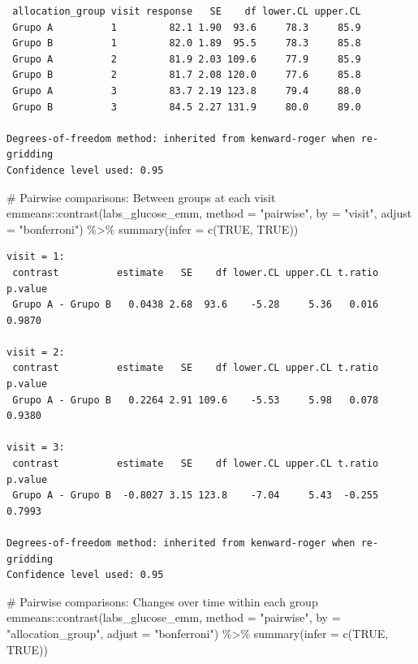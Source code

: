 \documentclass[
  letterpaper,
  DIV=11,
  numbers=noendperiod]{scrartcl}
\newenvironment{Shaded}{\begin{snugshade}}{\end{snugshade}}
\newcommand{\AttributeTok}[1]{\textcolor[rgb]{0.40,0.45,0.13}{#1}}
\newcommand{\CommentTok}[1]{\textcolor[rgb]{0.37,0.37,0.37}{#1}}
\newcommand{\ConstantTok}[1]{\textcolor[rgb]{0.56,0.35,0.01}{#1}}
\newcommand{\FunctionTok}[1]{\textcolor[rgb]{0.28,0.35,0.67}{#1}}
\newcommand{\NormalTok}[1]{\textcolor[rgb]{0.00,0.23,0.31}{#1}}
\newcommand{\SpecialCharTok}[1]{\textcolor[rgb]{0.37,0.37,0.37}{#1}}
\newcommand{\StringTok}[1]{\textcolor[rgb]{0.13,0.47,0.30}{#1}}
\begin{document}
\begin{verbatim}
 allocation_group visit response   SE    df lower.CL upper.CL
 Grupo A          1         82.1 1.90  93.6     78.3     85.9
 Grupo B          1         82.0 1.89  95.5     78.3     85.8
 Grupo A          2         81.9 2.03 109.6     77.9     85.9
 Grupo B          2         81.7 2.08 120.0     77.6     85.8
 Grupo A          3         83.7 2.19 123.8     79.4     88.0
 Grupo B          3         84.5 2.27 131.9     80.0     89.0

Degrees-of-freedom method: inherited from kenward-roger when re-gridding 
Confidence level used: 0.95 
\end{verbatim}

\begin{Shaded}
\begin{Highlighting}[]
\CommentTok{\# Pairwise comparisons: Between groups at each visit}
\NormalTok{emmeans}\SpecialCharTok{::}\FunctionTok{contrast}\NormalTok{(labs\_glucose\_emm, }\AttributeTok{method =} \StringTok{"pairwise"}\NormalTok{, }\AttributeTok{by =} \StringTok{"visit"}\NormalTok{, }\AttributeTok{adjust =} \StringTok{"bonferroni"}\NormalTok{) }\SpecialCharTok{\%\textgreater{}\%} \FunctionTok{summary}\NormalTok{(}\AttributeTok{infer =} \FunctionTok{c}\NormalTok{(}\ConstantTok{TRUE}\NormalTok{, }\ConstantTok{TRUE}\NormalTok{))}
\end{Highlighting}
\end{Shaded}

\begin{verbatim}
visit = 1:
 contrast          estimate   SE    df lower.CL upper.CL t.ratio p.value
 Grupo A - Grupo B   0.0438 2.68  93.6    -5.28     5.36   0.016  0.9870

visit = 2:
 contrast          estimate   SE    df lower.CL upper.CL t.ratio p.value
 Grupo A - Grupo B   0.2264 2.91 109.6    -5.53     5.98   0.078  0.9380

visit = 3:
 contrast          estimate   SE    df lower.CL upper.CL t.ratio p.value
 Grupo A - Grupo B  -0.8027 3.15 123.8    -7.04     5.43  -0.255  0.7993

Degrees-of-freedom method: inherited from kenward-roger when re-gridding 
Confidence level used: 0.95 
\end{verbatim}

\begin{Shaded}
\begin{Highlighting}[]
\CommentTok{\# Pairwise comparisons: Changes over time within each group}
\NormalTok{emmeans}\SpecialCharTok{::}\FunctionTok{contrast}\NormalTok{(labs\_glucose\_emm, }\AttributeTok{method =} \StringTok{"pairwise"}\NormalTok{, }\AttributeTok{by =} \StringTok{"allocation\_group"}\NormalTok{, }\AttributeTok{adjust =} \StringTok{"bonferroni"}\NormalTok{) }\SpecialCharTok{\%\textgreater{}\%} \FunctionTok{summary}\NormalTok{(}\AttributeTok{infer =} \FunctionTok{c}\NormalTok{(}\ConstantTok{TRUE}\NormalTok{, }\ConstantTok{TRUE}\NormalTok{))}
\end{Highlighting}
\end{Shaded}
\end{document}
